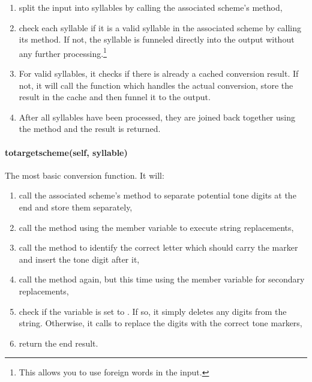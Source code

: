\documentclass{ltxdockit}
\begin{document}
\begin{enumerate}
  \item split the input into syllables by calling the associated 
    scheme's  method,
  \item check each syllable if it is a valid syllable in the associated
     scheme by calling its
     method. If not, the
    syllable is funneled directly into the output without any further
    processing.\footnote{This allows you to use foreign words in the input.}
  \item For valid syllables, it checks if there is already a cached conversion
    result. If not, it will call the
     function which
    handles the actual conversion, store the result in the cache and then funnel
    it to the output.
  \item After all syllables have been processed, they are joined back together
    using the  method and the result is returned.
\end{enumerate}

\paragraph{to\textunderscore{}target\textunderscore{}scheme(self, syllable)}

The most basic conversion function. It will:

\begin{enumerate}
  \item call the associated  scheme's
     method
    to separate potential tone digits at the end and store them separately,
  \item call the  method using
    the  member variable to execute string
    replacements,
  \item call the  method
    to identify the correct letter which should carry the marker and insert the
    tone digit after it,
  \item call the  method
    again, but this time using the
     member variable for
    secondary replacements,
  \item check if the  variable is set to
    . If so, it simply deletes any digits from the string. Otherwise,
    it calls  to replace
    the digits with the correct tone markers,
  \item return the end result.
\end{enumerate}
\end{document}
